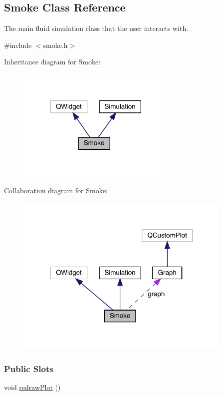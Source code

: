 \hypertarget{classSmoke}{}\subsection{Smoke Class Reference}
\label{classSmoke}


The main fluid simulation class that the user interacts with.  




{\ttfamily \#include $<$smoke.\+h$>$}



Inheritance diagram for Smoke\+:\nopagebreak
\begin{figure}[H]
\begin{center}
\leavevmode
\includegraphics[width=216pt]{classSmoke__inherit__graph}
\end{center}
\end{figure}


Collaboration diagram for Smoke\+:\nopagebreak
\begin{figure}[H]
\begin{center}
\leavevmode
\includegraphics[width=293pt]{classSmoke__coll__graph}
\end{center}
\end{figure}
\subsubsection*{Public Slots}
\begin{DoxyCompactItemize}
\item 
void \mbox{\hyperlink{classSmoke_a558447ca2b067daebfca58a2d8b30f66}{redraw\+Plot}} ()
\end{DoxyCompactItemize}
